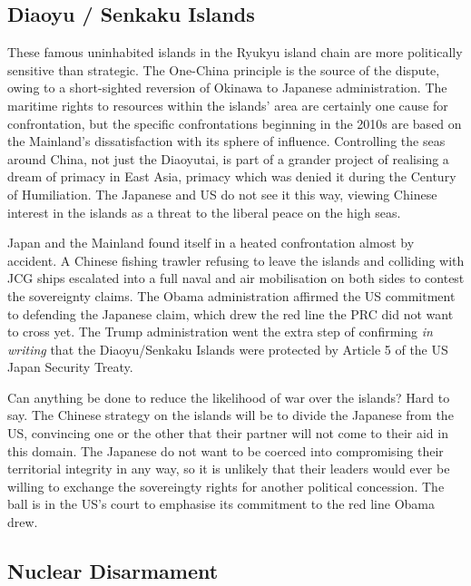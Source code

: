 \documentclass[letterpaper,12pt,twoside]{article} %
\begin{document}
\begin{multicols}{2}
\subsection{Diaoyu / Senkaku Islands}

These famous uninhabited islands in the Ryukyu island chain are more politically sensitive than strategic. The One-China principle is the source of the dispute, owing to a short-sighted reversion of Okinawa to Japanese administration. The maritime rights to resources within the islands' area are certainly one cause for confrontation, but the specific confrontations beginning in the 2010s are based on the Mainland's dissatisfaction with its sphere of influence. Controlling the seas around China, not just the Diaoyutai, is part of a grander project of realising a dream of primacy in East Asia, primacy which was denied it during the Century of Humiliation. The Japanese and US do not see it this way, viewing Chinese interest in the islands as a threat to the liberal peace on the high seas.

Japan and the Mainland found itself in a heated confrontation almost by accident. A Chinese fishing trawler refusing to leave the islands and colliding with JCG ships escalated into a full naval and air mobilisation on both sides to contest the sovereignty claims. The Obama administration affirmed the US commitment to defending the Japanese claim, which drew the red line the PRC did not want to cross yet. The Trump administration went the extra step of confirming \textit{in writing} that the Diaoyu/Senkaku Islands were protected by Article 5 of the US Japan Security Treaty.

Can anything be done to reduce the likelihood of war over the islands? Hard to say. The Chinese strategy on the islands will be to divide the Japanese from the US, convincing one or the other that their partner will not come to their aid in this domain. The Japanese do not want to be coerced into compromising their territorial integrity in any way, so it is unlikely that their leaders would ever be willing to exchange the sovereingty rights for another political concession. The ball is in the US's court to emphasise its commitment to the red line Obama drew.

\subsection{Nuclear Disarmament}


\end{multicols}
\end{document}
